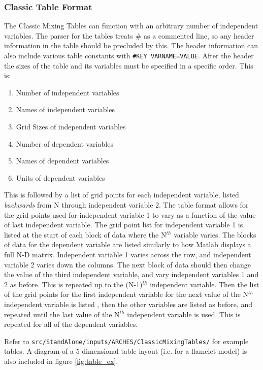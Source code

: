 \subsubsection{Classic Table Format}

The Classic Mixing Tables can function with an arbitrary number of independent variables.  The parser for the tables treats \# as a commented line, so any header information in the table should be precluded by this.  The header information can also include various table constants with \verb+#KEY VARNAME=VALUE+.  After the header the sizes of the table and its variables must be specified in a specific order.  This is:

\begin{enumerate}
\item{Number of independent variables}
\item{Names of independent variables}
\item{Grid Sizes of independent variables}
\item{Number of dependent variables}
\item{Names of dependent variables}
\item{Units of dependent variables}
\end{enumerate}

This is followed by a list of grid points for each independent variable, listed \textit{backwards} from N through independent variable 2. The table format allows for the grid points used for independent variable 1 to vary as a function of the value of last independent variable. The grid point list for independent variable 1 is listed at the start of each block of data where the N$^{th}$ variable varies.  The blocks of data for the dependent variable are listed similarly to how Matlab displays a full N-D matrix.  Independent  variable 1 varies across the row, and independent variable 2 varies down the columns.  The next block of data should then change the value of the third independent variable, and vary independent variables 1 and 2 as before.  This is repeated up to the (N-1)$^{th}$ independent variable.  Then the list of the grid points for the first independent variable for the next value of the N$^{th}$ independent variable is listed , then the other variables are listed as before, and repeated until the last value of the N$^{th}$ independent variable is used.  This is repeated for all of the dependent variables.

Refer to \verb=src/StandAlone/inputs/ARCHES/ClassicMixingTables/= for example tables.  A diagram of a 5 dimensional table layout (i.e. for a flamelet model) is also included in figure \ref{fig:table_ex}.

